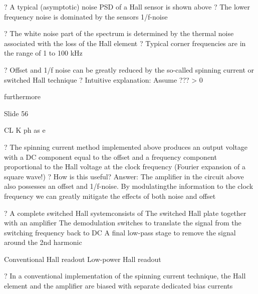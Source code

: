 \documentclass[2pt,landscape]{article}
\begin{document}
\begin{multicols*}{5}
?	A typical (asymptotic) noise PSD of a Hall sensor is shown above
?	The lower frequency noise is dominated by the sensor\textbullet s 1/f-noise


?	The white noise part of the spectrum is determined by the thermal 
noise associated with the loss of the Hall element
?	Typical corner frequencies are in the range of 1 to 100 kHz



?	Offset and 1/f noise can be greatly reduced by the so-called spinning 
current or switched Hall technique
?	Intuitive explanation: 
Assume ??? > 0

furthermore

















Slide 56


CL
K 
ph
as
e









?	The spinning current method implemented above produces an output voltage 
with a DC component equal to the offset and a frequency component 
proportional to the Hall voltage at the clock frequency (Fourier expansion of a 
square wave!)
?	How is this useful? Answer:
The amplifier in the circuit above also possesses an offset and 1/f-noise. By 
\textbullet modulating\textbullet the information to the clock frequency we can greatly mitigate the 
effects of both noise and offset











?	A complete \textbullet switched Hall system\textbullet consists of
\textbullet 	The switched Hall plate together with an amplifier
\textbullet 	The demodulation switches to translate the signal from the switching 
frequency back to DC
\textbullet 	A final low-pass stage to remove the signal around the 2nd harmonic



Conventional Hall readout	Low-power Hall readout

?	In a conventional implementation of the spinning current technique, the Hall 
element and the amplifier are biased with separate dedicated bias currents


\end{multicols*}
\end{document}
